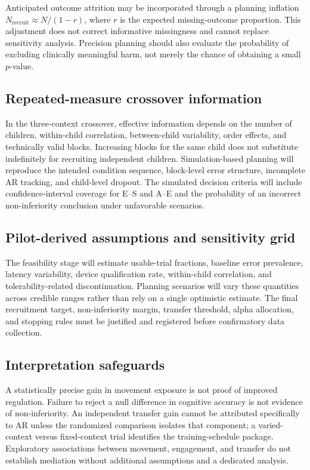 Anticipated outcome attrition may be incorporated through a planning inflation \(N_{\mathrm{recruit}}\approx N/(1-r)\), where \(r\) is the expected missing-outcome proportion. This adjustment does not correct informative missingness and cannot replace sensitivity analysis. Precision planning should also evaluate the probability of excluding clinically meaningful harm, not merely the chance of obtaining a small \(p\)-value.

\subsection{Repeated-measure crossover information}
In the three-context crossover, effective information depends on the number of children, within-child correlation, between-child variability, order effects, and technically valid blocks. Increasing blocks for the same child does not substitute indefinitely for recruiting independent children. Simulation-based planning will reproduce the intended condition sequence, block-level error structure, incomplete AR tracking, and child-level dropout. The simulated decision criteria will include confidence-interval coverage for E--S and A--E and the probability of an incorrect non-inferiority conclusion under unfavorable scenarios.

\subsection{Pilot-derived assumptions and sensitivity grid}
The feasibility stage will estimate usable-trial fractions, baseline error prevalence, latency variability, device qualification rate, within-child correlation, and tolerability-related discontinuation. Planning scenarios will vary these quantities across credible ranges rather than rely on a single optimistic estimate. The final recruitment target, non-inferiority margin, transfer threshold, alpha allocation, and stopping rules must be justified and registered before confirmatory data collection.

\subsection{Interpretation safeguards}
A statistically precise gain in movement exposure is not proof of improved regulation. Failure to reject a null difference in cognitive accuracy is not evidence of non-inferiority. An independent transfer gain cannot be attributed specifically to AR unless the randomized comparison isolates that component; a varied-context versus fixed-context trial identifies the training-schedule package. Exploratory associations between movement, engagement, and transfer do not establish mediation without additional assumptions and a dedicated analysis.